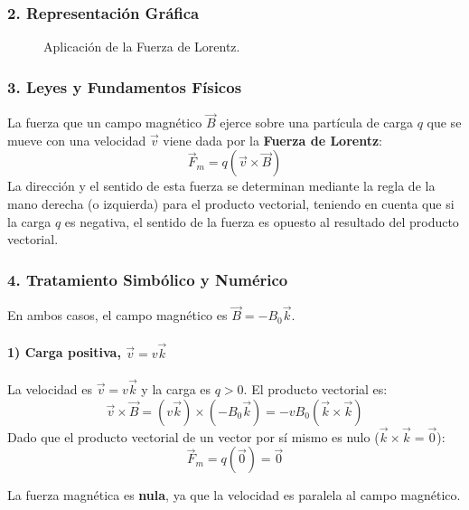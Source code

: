 \subsubsection*{2. Representación Gráfica}
\begin{figure}[H]
    \centering
    \caption{Aplicación de la Fuerza de Lorentz.}
\end{figure}

\subsubsection*{3. Leyes y Fundamentos Físicos}
La fuerza que un campo magnético $\vec{B}$ ejerce sobre una partícula de carga $q$ que se mueve con una velocidad $\vec{v}$ viene dada por la \textbf{Fuerza de Lorentz}:
$$ \vec{F}_m = q (\vec{v} \times \vec{B}) $$
La dirección y el sentido de esta fuerza se determinan mediante la regla de la mano derecha (o izquierda) para el producto vectorial, teniendo en cuenta que si la carga $q$ es negativa, el sentido de la fuerza es opuesto al resultado del producto vectorial.

\subsubsection*{4. Tratamiento Simbólico y Numérico}
En ambos casos, el campo magnético es $\vec{B} = -B_0\vec{k}$.

\paragraph{1) Carga positiva, $\vec{v} = v\vec{k}$}
La velocidad es $\vec{v} = v\vec{k}$ y la carga es $q>0$.
El producto vectorial es:
$$ \vec{v} \times \vec{B} = (v\vec{k}) \times (-B_0\vec{k}) = -vB_0(\vec{k} \times \vec{k}) $$
Dado que el producto vectorial de un vector por sí mismo es nulo ($\vec{k} \times \vec{k} = \vec{0}$):
$$ \vec{F}_m = q(\vec{0}) = \vec{0} $$
\begin{cajaresultado}
La fuerza magnética es \textbf{nula}, ya que la velocidad es paralela al campo magnético.
\end{cajaresultado}

